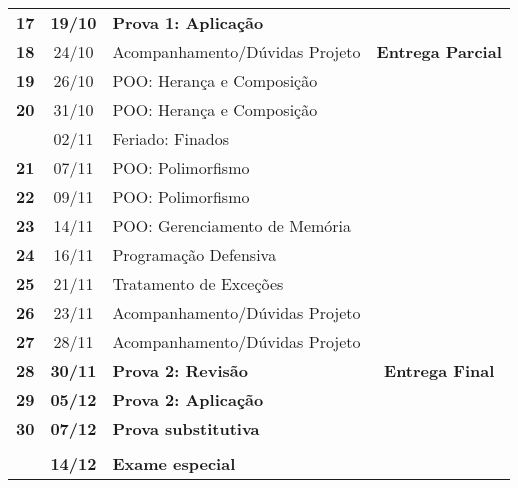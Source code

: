 \documentclass[11pt]{article}
\begin{document}
\begin{center}
\begin{tabular}{>{\bfseries}ccl>{\bfseries}c}
\rowcolor{yellow!50} 17 & \textbf{19/10} & \textbf{Prova 1: Aplicação} & \\[0pt]
18 & 24/10 & Acompanhamento/Dúvidas Projeto & Entrega Parcial\\[0pt]
19 & 26/10 & POO: Herança e Composição & \\[0pt]
20 & 31/10 & POO: Herança e Composição & \\[0pt]
\rowcolor{green!40} & 02/11 & Feriado: Finados & \\[0pt]
21 & 07/11 & POO: Polimorfismo & \\[0pt]
22 & 09/11 & POO: Polimorfismo & \\[0pt]
23 & 14/11 & POO: Gerenciamento de Memória & \\[0pt]
24 & 16/11 & Programação Defensiva & \\[0pt]
25 & 21/11 & Tratamento de Exceções & \\[0pt]
26 & 23/11 & Acompanhamento/Dúvidas Projeto & \\[0pt]
27 & 28/11 & Acompanhamento/Dúvidas Projeto & \\[0pt]
\rowcolor{yellow!50} 28 & \textbf{30/11} & \textbf{Prova 2: Revisão} & Entrega Final\\[0pt]
\rowcolor{yellow!50} 29 & \textbf{05/12} & \textbf{Prova 2: Aplicação} & \\[0pt]
\rowcolor{yellow!50} 30 & \textbf{07/12} & \textbf{Prova substitutiva} & \\[0pt]
 &  &  & \\[0pt]
\rowcolor{yellow!50} & \textbf{14/12} & \textbf{Exame especial} & \\[0pt]
\bottomrule
\end{tabular}
\end{center}
\end{document}
